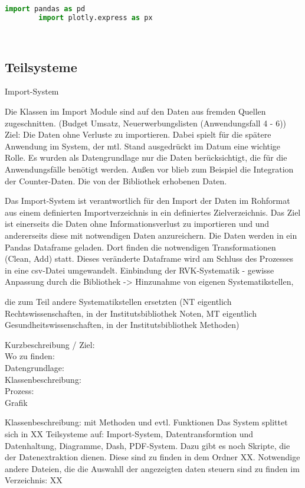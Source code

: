     \begin{lstlisting}[language=Python, caption=Python example]
        import pandas as pd
        import plotly.express as px

        
    \end{lstlisting}

    \subsection{Teilsysteme}
    
    Import-System
    
    Die Klassen im Import Module sind auf den Daten aus fremden Quellen zugeschnitten.
    (Budget Umsatz, Neuerwerbungslisten (Anwendungsfall 4 - 6))
    Ziel: Die Daten ohne Verluste zu importieren. Dabei spielt für die spätere Anwendung im System, der mtl. Stand
    ausgedrückt im Datum eine wichtige Rolle.
    Es wurden als Datengrundlage nur die Daten berücksichtigt, die für die Anwendungsfälle benötigt werden.
    Außen vor blieb zum Beispiel die Integration der Counter-Daten.
    Die von der Bibliothek erhobenen Daten.
    
    Das Import-System ist verantwortlich für den Import der Daten im Rohformat aus einem definierten Importverzeichnis in ein definiertes Zielverzeichnis. Das Ziel
    ist einerseits die Daten ohne Informationsverlust zu importieren und und andererseits diese mit notwendigen Daten anzureichern. Die Daten werden in ein Pandas Dataframe
    geladen. Dort finden die notwendigen Transformationen (Clean, Add) statt. Dieses veränderte Dataframe wird am Schluss des Prozesses in eine csv-Datei umgewandelt.
    Einbindung der RVK-Systematik - gewisse Anpassung durch die Bibliothek -> Hinzunahme von eigenen Systematikstellen,
    
    die zum Teil andere Systematikstellen ersetzten (NT eigentlich Rechtswissenschaften, in der Institutsbibliothek Noten, MT eigentlich
    Gesundheitswissenschaften, in der Institutsbibliothek Methoden)
 
      
    Kurzbeschreibung / Ziel:\\
    Wo zu finden:\\
    Datengrundlage:\\
    Klassenbeschreibung:\\
    Prozess:\\
    
    Grafik
    
    Klassenbeschreibung: mit Methoden und evtl. Funktionen
    Das System splittet sich in XX Teilsysteme auf: Import-System, Datentransformtion und Datenhaltung, Diagramme, Dash, PDF-System. Dazu gibt es noch Skripte,
    die der Datenextraktion dienen. Diese sind zu finden in dem Ordner XX. Notwendige andere Dateien, die die Auswahll der angezeigten daten steuern sind zu finden im          
    Verzeichnis: XX
    
